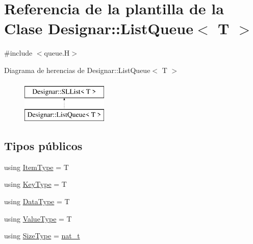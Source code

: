 \hypertarget{class_designar_1_1_list_queue}{}\section{Referencia de la plantilla de la Clase Designar\+:\+:List\+Queue$<$ T $>$}
\label{class_designar_1_1_list_queue}


{\ttfamily \#include $<$queue.\+H$>$}

Diagrama de herencias de Designar\+:\+:List\+Queue$<$ T $>$\begin{figure}[H]
\begin{center}
\leavevmode
\includegraphics[height=2.000000cm]{class_designar_1_1_list_queue}
\end{center}
\end{figure}
\subsection*{Tipos públicos}
\begin{DoxyCompactItemize}
\item 
using \hyperlink{class_designar_1_1_list_queue_ab2057fd5d92eccf8de8daed70e0182b2}{Item\+Type} = T
\item 
using \hyperlink{class_designar_1_1_list_queue_abb867bba1fa9e40a4bbc27160e5148c5}{Key\+Type} = T
\item 
using \hyperlink{class_designar_1_1_list_queue_a5aae5b0703cf71bce7457e5420d59c8f}{Data\+Type} = T
\item 
using \hyperlink{class_designar_1_1_list_queue_aa5dc35fd7e235c69f4473a96eaae2de3}{Value\+Type} = T
\item 
using \hyperlink{class_designar_1_1_list_queue_a506b74cc71e3d3ad8767ad393b4704b6}{Size\+Type} = \hyperlink{namespace_designar_aa72662848b9f4815e7bf31a7cf3e33d1}{nat\+\_\+t}
\end{DoxyCompactItemize}
